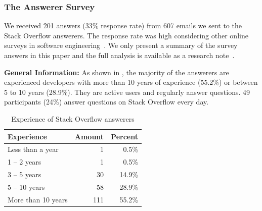 \documentclass[10pt,journal,compsoc]{IEEEtran}
\begin{document}

\subsubsection{The Answerer Survey}

We received 201 answers (33\% response rate) from 607 emails we sent to the
Stack Overflow answerers. The response rate was high considering other
online surveys in software engineering~\cite{Punter2003}. 
We only present a summary of the survey answers in
this paper and the full analysis is available as a research note~\cite{Ragkhitwetsagul_RN2017}.

\textbf{General Information:} As shown in , the majority of the answerers are experienced
developers with more than 10 years of experience (55.2\%) or between 5 to 10
years (28.9\%). They are active users and regularly answer questions. 49
participants (24\%) answer questions on Stack Overflow every day.

\begin{table}
	\centering
	\caption{Experience of Stack Overflow answerers}
	\label{tab:survey_exp}
	\begin{tabular}{lrr}
		\toprule
		Experience & Amount & Percent \\
		\midrule
		Less than a year & 1 & 0.5\% \\
		1 -- 2 years & 1 & 0.5\% \\
		3 -- 5 years & 30 & 14.9\% \\
		5 -- 10 years & 58 & 28.9\% \\
		More than 10 years	& 111 & 55.2\% \\
		\bottomrule
	\end{tabular}
\end{table}
\end{document}
